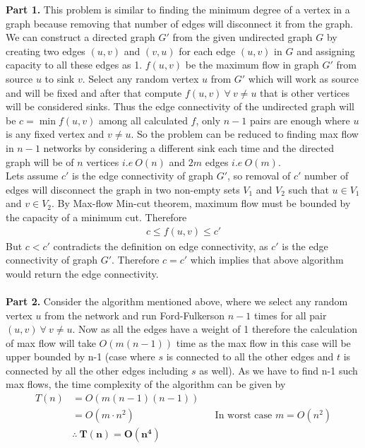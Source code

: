 \documentclass[a4paper,11pt]{article}
\theoremstyle{quest}
\newenvironment{solution}[2][Solution]{\begin{trivlist}
		\item[\hskip \labelsep {\bfseries #1}\hskip \labelsep {\bfseries #2.}]}{\end{trivlist}}
\begin{document}
\newpage
\begin{solution}2 \textbf{Part 1. }This problem is similar to finding the minimum degree of a vertex in a graph because removing that number of edges will disconnect it from the graph.\\
	
We can construct a directed graph $G'$ from the given undirected graph $G$ by creating two edges $(u,v)$ and $(v,u)$ for each edge $(u,v)$ in $G$ and assigning capacity to all these edges as 1. $f(u,v)$ be the maximum flow in graph $G'$ from source $u$ to sink $v$. Select any random vertex $u$ from $G'$ which will work as source and will be fixed and after that compute $f(u,v)~\forall~v \neq u$ that is other vertices will be considered sinks. Thus the edge connectivity of the undirected graph will be $c = \min f(u,v)$ among all calculated $f$, only $n-1$ pairs are enough where $u$ is any fixed vertex and $v \neq u$. So the problem can be reduced to finding max flow in $n-1$ networks by considering a different sink each time and the directed graph will be of $n$ vertices $i.e ~ O(n)$ and $2m$ edges $i.e ~ O(m)$.\\

Lets assume $c'$ is the edge connectivity of graph $G'$, so removal of $c'$ number of edges will disconnect the graph in two non-empty sets $V_1$ and $V_2$ such that $u \in V_1$ and $v \in V_2$. By Max-flow Min-cut theorem, maximum flow must be bounded by the
	capacity of a minimum cut. Therefore
	\begin{align*}
	c \le f(u,v) \le c'
	\end{align*}
	But $c < c'$ contradicts the definition on edge connectivity, as $c'$ is the edge connectivity of graph $G'$. Therefore $c=c'$ which implies that above algorithm would return the edge connectivity.\\\\
	\textbf{Part 2. }Consider the algorithm mentioned above, where we select any random vertex $u$ from the network and run Ford-Fulkerson $n-1$ times for all pair $(u,v)~\forall~v \neq u$. Now as all the edges have a weight of 1 therefore the calculation of max flow will take $O(m(n-1))$ time as the max flow in this case will be upper bounded by n-1 (case where $s$ is connected to all the other edges and $t$ is connected by all the other edges including $s$ as well). As we have to find n-1 such max flows, the time complexity of the algorithm can be given by
	\begin{align*}
	T(n) &= O(m(n-1)(n-1))\\
	&= O(m\cdot n^2)  && \text{In worst case $m = O(n^2)$}\\
	& \boxed{\therefore~\mathbf{T(n) = O(n^4)}}
	\end{align*}

\end{solution} 
\end{document}

